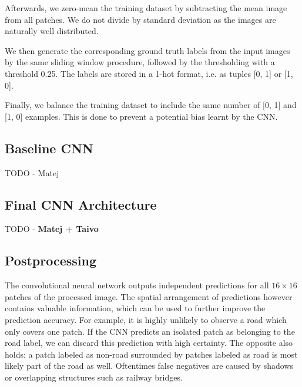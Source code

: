 \documentclass[10pt,conference,compsocconf]{IEEEtran}
\begin{document}
Afterwards, we zero-mean the training dataset by subtracting the mean image from all patches. We do not divide by standard deviation as the images are naturally well distributed.

We then generate the corresponding ground truth labels from the input images by the same sliding window procedure, followed by the thresholding with a threshold 0.25. The labels are stored in a 1-hot format, i.e. as tuples [0, 1] or [1, 0].

Finally, we balance the training dataset to include the same number of [0, 1] and [1, 0] examples. This is done to prevent a potential bias learnt by the CNN.

\subsection{Baseline CNN}
\label{subsec:baselineCNN}
TODO - Matej

\subsection{Final CNN Architecture}
\label{subsec:CNN}
TODO - \textbf{Matej + Taivo}

\subsection{Postprocessing}
The convolutional neural network outputs independent predictions for all $ 16 \times 16 $ patches of the processed image. The spatial arrangement of predictions however contains valuable information, which can be used to further improve the prediction accuracy. For example, it is highly unlikely to observe a road which only covers one patch. If the CNN predicts an isolated patch as belonging to the road label, we can discard this prediction with high certainty. The opposite also holds: a patch labeled as non-road surrounded by patches labeled as road is most likely part of the road as well. Oftentimes false negatives are caused by shadows or overlapping structures such as railway bridges.
\end{document}
